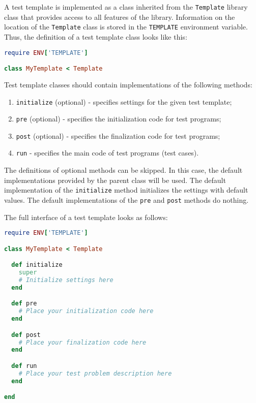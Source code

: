 \documentclass[oneside,final,12pt]{extreport}
\begin{document}
A test template is implemented as a class inherited from the \texttt{Template} library class
that provides access to all features of the library. Information on the location of
the \texttt{Template} class is stored in the \texttt{TEMPLATE} environment variable.
Thus, the definition of a test template class looks like this:

\begin{lstlisting}[language=ruby]
require ENV['TEMPLATE']

class MyTemplate < Template
\end{lstlisting}

Test template classes should contain implementations of the following methods:

\begin{enumerate}
  \item \texttt{initialize} (optional) - specifies settings for the given test template;
  \item \texttt{pre} (optional) - specifies the initialization code for test programs;
  \item \texttt{post} (optional) - specifies the finalization code for test programs;
  \item \texttt{run} - specifies the main code of test programs (test cases).
\end{enumerate}

The definitions of optional methods can be skipped. In this case, the default
implementations provided by the parent class will be used. The default implementation
of the \texttt{initialize} method initializes the settings with default values. The default
implementations of the \texttt{pre} and \texttt{post} methods do nothing.

The full interface of a test template looks as follows:

\begin{lstlisting}[language=ruby]
require ENV['TEMPLATE']

class MyTemplate < Template

  def initialize
    super
    # Initialize settings here 
  end

  def pre
    # Place your initialization code here
  end

  def post
    # Place your finalization code here
  end

  def run
    # Place your test problem description here
  end

end
\end{lstlisting}

\end{document}

